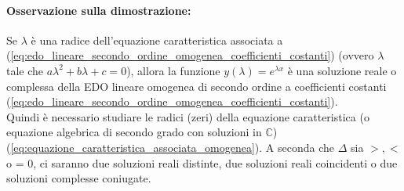 \paragraph{Osservazione sulla dimostrazione:} Se $\lambda$ è una radice dell'equazione caratteristica associata a (\ref{eq:edo_lineare_secondo_ordine_omogenea_coefficienti_costanti}) (ovvero $\lambda$ tale che $a\lambda^2 + b\lambda + c= 0$), allora la funzione $y(\lambda)=e^{\lambda x}$ è una soluzione reale o complessa della EDO lineare omogenea di secondo ordine a coefficienti costanti (\ref{eq:edo_lineare_secondo_ordine_omogenea_coefficienti_costanti}).\\
Quindi è necessario studiare le radici (zeri) della equazione caratteristica (o equazione algebrica di secondo grado con soluzioni in $\mathbb{C}$) (\ref{eq:equazione_caratteristica_associata_omogenea}). A seconda che $\Delta$ sia $>, <$ o = 0, ci saranno due soluzioni reali distinte, due soluzioni reali coincidenti o due soluzioni complesse coniugate.

